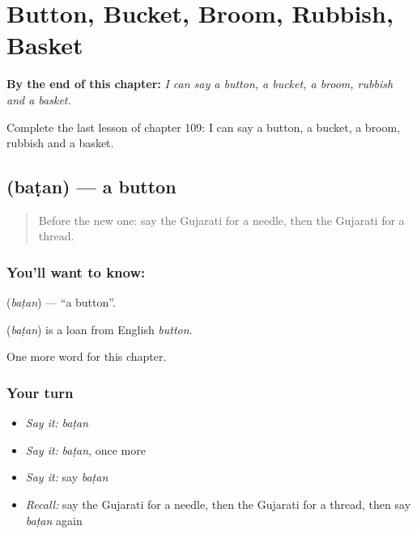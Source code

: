 
\chapter{Button, Bucket, Broom, Rubbish, Basket}
\label{ch:gu-button-bucket-broom-rubbish-basket}

\begin{chapteropening}
\textbf{By the end of this chapter:} \emph{I can say a button, a bucket, a broom, rubbish and a basket.}

Complete the last lesson of chapter 109: I can say a button, a bucket, a broom, rubbish and a basket.
\end{chapteropening}

\section[\texorpdfstring{\gu{બટન} (baṭan)}{બટન (baṭan)}]{ (baṭan) — a button}

\label{lesson:GU-C109-batan}



\begin{quote}
Before the new one: say the Gujarati for a needle, then the Gujarati for a thread.
\end{quote}

\subsection*{You'll want to know: }
\textbf{} (\emph{baṭan}) — \textquotedblleft{}a button\textquotedblright{}.

\begin{cousinweb}
\textbf{} (\emph{baṭan}) is a loan from English \emph{button}.
\end{cousinweb}

\begin{grammarlens}[title={What you've built}]
One more word for this chapter.
\end{grammarlens}

\subsection*{Your turn}
\begin{itemize}
\raggedright
  \item \emph{Say it:} \emph{baṭan}
  \item \emph{Say it:} \emph{baṭan}, once more
  \item \emph{Say it:} say \emph{baṭan}
  \item \emph{Recall:} say the Gujarati for a needle, then the Gujarati for a thread, then say \emph{baṭan} again
\end{itemize}

